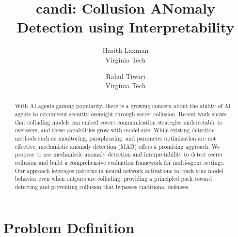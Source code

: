 


\date{}

\title{\Large \bf candi: Collusion ANomaly Detection using Interpretability}

\author{
{\rm Harith Laxman}\\
Virginia Tech
\and
{\rm Rahul Tiwari}\\
Virginia Tech
} %

\maketitle

\begin{abstract}
With AI agents gaining popularity, there is a growing concern about the ability of AI agents to circumvent security oversight through secret collusion. Recent work shows that colluding models can embed covert communication strategies undetectable to overseers, and these capabilities grow with model size. While existing detection methods such as monitoring, paraphrasing, and parameter optimization are not effective, mechanistic anomaly detection (MAD) offers a promising approach. We propose to use mechanistic anomaly detection and interpretability to detect secret collusion and build a comprehensive evaluation framework for multi-agent settings. Our approach leverages patterns in neural network activations to track true model behavior even when outputs are colluding, providing a principled path toward detecting and preventing collusion that bypasses traditional defenses.
\end{abstract}


\section{Problem Definition}

